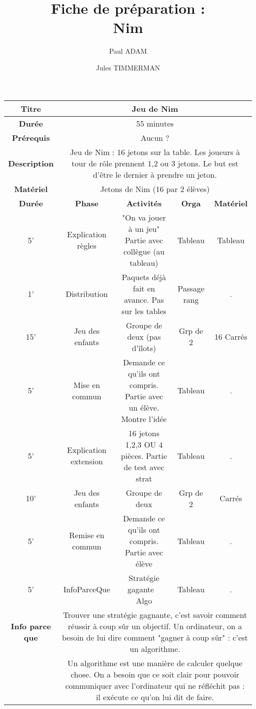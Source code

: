 \documentclass[12pt,landscape]{article}
\author{Paul ADAM \and Jules TIMMERMAN}
\title{Fiche de préparation :\\Nim}
\begin{document}
\begin{tabular}{|c|c|c|c|c|}
	\hline
	\textbf{Titre} & \multicolumn{4}{|c|}{Jeu de Nim}\\
	\hline
	\textbf{Durée} & \multicolumn{4}{|c|}{55 minutes}\\
	\hline
	\textbf{Prérequis} & \multicolumn{4}{|c|}{Aucun ?}\\
	\hline
	\textbf{Description} & \multicolumn{4}{|c|}{Jeu de Nim : 16 jetons sur la table. Les joueurs à tour de rôle prennent 1,2 ou 3 jetons. Le but est d'être le dernier à prendre un jeton.}\\
	\hline
	\textbf{Matériel} & \multicolumn{4}{|c|}{Jetons de Nim (16 par 2 élèves)}\\
	\hline
	\textbf{Durée} & \textbf{Phase} & \textbf{Activités} & \textbf{Orga} & \textbf{Matériel}\\
	\hline
	
	5' & Explication règles & "On va jouer à un jeu" Partie avec collègue (au tableau) & Tableau & Tableau\\

	1' & Distribution & Paquets déjà fait en avance. Pas sur les tables & Passage rang & .\\
	
	15' & Jeu des enfants & Groupe de deux (pas d'îlots) & Grp de 2 & 16 Carrés\\

	5' & Mise en commun & Demande ce qu'ils ont compris. Partie avec un élève. Montre l'idée & Tableau & .\\

	5' & Explication extension & 16 jetons 1,2,3 OU 4 pièces. Partie de test avec strat & Tableau & .\\

	10' & Jeu des enfants & Groupe de deux & Grp de 2 & Carrés\\

	5' & Remise en commun & Demande ce qu'ils ont compris. Partie avec élève & Tableau & .\\

	5' & InfoParceQue & Stratégie gagante ~ Algo & Tableau & .\\
	
	\hline

	\textbf{Info parce que} & \multicolumn{4}{|c|}{Trouver une stratégie gagnante, c'est savoir comment réussir à coup sûr un objectif. Un ordinateur, on a besoin de lui dire comment "gagner à coup sûr" : c'est un algorithme.
	}\\
	& \multicolumn{4}{|c|}{Un algorithme est une manière de calculer quelque chose. On a besoin que ce soit clair pour pouvoir communiquer avec l'ordinateur qui ne réfléchit pas : il exécute ce qu'on lui dit de faire.}\\
	\hline




														


										



\end{tabular}
\end{document}
